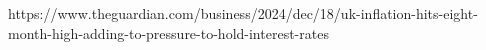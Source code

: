 https://www.theguardian.com/business/2024/dec/18/uk-inflation-hits-eight-month-high-adding-to-pressure-to-hold-interest-rates